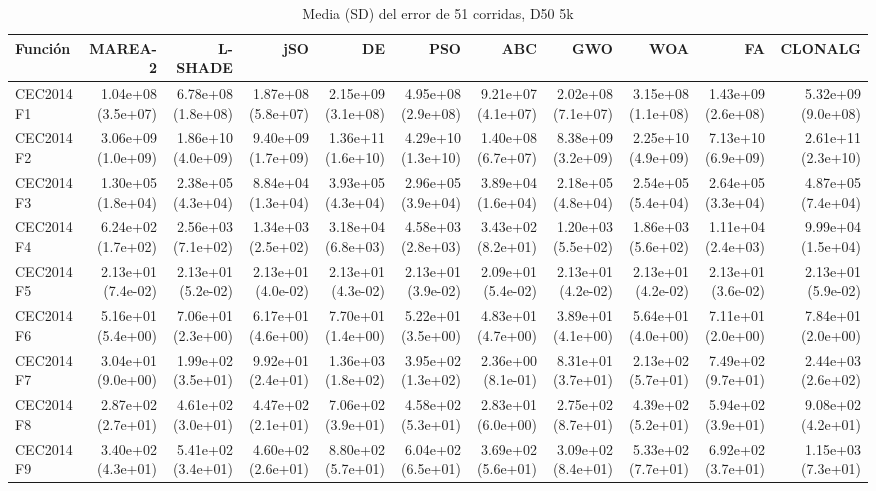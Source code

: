 \begin{longtable}{lrrrrrrrrrr}
\caption{Media (SD) del error de 51 corridas, D50 5k}\\
\toprule
Función & MAREA-2 & L-SHADE & jSO & DE & PSO & ABC & GWO & WOA & FA & CLONALG \\
\midrule
\endhead
CEC2014 F1 & 1.04e+08 (3.5e+07) & 6.78e+08 (1.8e+08) & 1.87e+08 (5.8e+07) & 2.15e+09 (3.1e+08) & 4.95e+08 (2.9e+08) & 9.21e+07 (4.1e+07) & 2.02e+08 (7.1e+07) & 3.15e+08 (1.1e+08) & 1.43e+09 (2.6e+08) & 5.32e+09 (9.0e+08) \\
CEC2014 F2 & 3.06e+09 (1.0e+09) & 1.86e+10 (4.0e+09) & 9.40e+09 (1.7e+09) & 1.36e+11 (1.6e+10) & 4.29e+10 (1.3e+10) & 1.40e+08 (6.7e+07) & 8.38e+09 (3.2e+09) & 2.25e+10 (4.9e+09) & 7.13e+10 (6.9e+09) & 2.61e+11 (2.3e+10) \\
CEC2014 F3 & 1.30e+05 (1.8e+04) & 2.38e+05 (4.3e+04) & 8.84e+04 (1.3e+04) & 3.93e+05 (4.3e+04) & 2.96e+05 (3.9e+04) & 3.89e+04 (1.6e+04) & 2.18e+05 (4.8e+04) & 2.54e+05 (5.4e+04) & 2.64e+05 (3.3e+04) & 4.87e+05 (7.4e+04) \\
CEC2014 F4 & 6.24e+02 (1.7e+02) & 2.56e+03 (7.1e+02) & 1.34e+03 (2.5e+02) & 3.18e+04 (6.8e+03) & 4.58e+03 (2.8e+03) & 3.43e+02 (8.2e+01) & 1.20e+03 (5.5e+02) & 1.86e+03 (5.6e+02) & 1.11e+04 (2.4e+03) & 9.99e+04 (1.5e+04) \\
CEC2014 F5 & 2.13e+01 (7.4e-02) & 2.13e+01 (5.2e-02) & 2.13e+01 (4.0e-02) & 2.13e+01 (4.3e-02) & 2.13e+01 (3.9e-02) & 2.09e+01 (5.4e-02) & 2.13e+01 (4.2e-02) & 2.13e+01 (4.2e-02) & 2.13e+01 (3.6e-02) & 2.13e+01 (5.9e-02) \\
CEC2014 F6 & 5.16e+01 (5.4e+00) & 7.06e+01 (2.3e+00) & 6.17e+01 (4.6e+00) & 7.70e+01 (1.4e+00) & 5.22e+01 (3.5e+00) & 4.83e+01 (4.7e+00) & 3.89e+01 (4.1e+00) & 5.64e+01 (4.0e+00) & 7.11e+01 (2.0e+00) & 7.84e+01 (2.0e+00) \\
CEC2014 F7 & 3.04e+01 (9.0e+00) & 1.99e+02 (3.5e+01) & 9.92e+01 (2.4e+01) & 1.36e+03 (1.8e+02) & 3.95e+02 (1.3e+02) & 2.36e+00 (8.1e-01) & 8.31e+01 (3.7e+01) & 2.13e+02 (5.7e+01) & 7.49e+02 (9.7e+01) & 2.44e+03 (2.6e+02) \\
CEC2014 F8 & 2.87e+02 (2.7e+01) & 4.61e+02 (3.0e+01) & 4.47e+02 (2.1e+01) & 7.06e+02 (3.9e+01) & 4.58e+02 (5.3e+01) & 2.83e+01 (6.0e+00) & 2.75e+02 (8.7e+01) & 4.39e+02 (5.2e+01) & 5.94e+02 (3.9e+01) & 9.08e+02 (4.2e+01) \\
CEC2014 F9 & 3.40e+02 (4.3e+01) & 5.41e+02 (3.4e+01) & 4.60e+02 (2.6e+01) & 8.80e+02 (5.7e+01) & 6.04e+02 (6.5e+01) & 3.69e+02 (5.6e+01) & 3.09e+02 (8.4e+01) & 5.33e+02 (7.7e+01) & 6.92e+02 (3.7e+01) & 1.15e+03 (7.3e+01) \\

\end{longtable}
